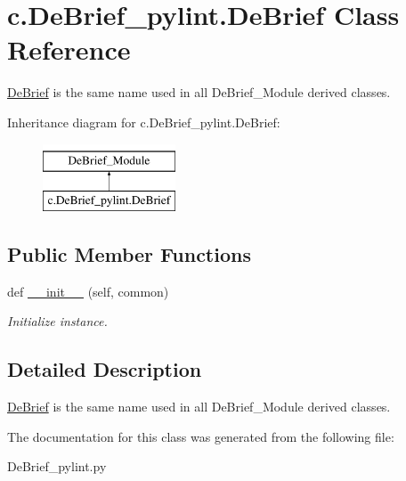 \hypertarget{classc_1_1_de_brief__pylint_1_1_de_brief}{}\section{c.\+De\+Brief\+\_\+pylint.\+De\+Brief Class Reference}
\label{classc_1_1_de_brief__pylint_1_1_de_brief}


\hyperlink{classc_1_1_de_brief__pylint_1_1_de_brief}{De\+Brief} is the same name used in all De\+Brief\+\_\+\+Module derived classes.  


Inheritance diagram for c.\+De\+Brief\+\_\+pylint.\+De\+Brief\+:\begin{figure}[H]
\begin{center}
\leavevmode
\includegraphics[height=2.000000cm]{classc_1_1_de_brief__pylint_1_1_de_brief}
\end{center}
\end{figure}
\subsection*{Public Member Functions}
\begin{DoxyCompactItemize}
\item 
\hypertarget{classc_1_1_de_brief__pylint_1_1_de_brief_aa5a33ccf08a642467d643c2e0dcca832}{}def \hyperlink{classc_1_1_de_brief__pylint_1_1_de_brief_aa5a33ccf08a642467d643c2e0dcca832}{\+\_\+\+\_\+init\+\_\+\+\_\+} (self, common)\label{classc_1_1_de_brief__pylint_1_1_de_brief_aa5a33ccf08a642467d643c2e0dcca832}

\begin{DoxyCompactList}\small\item\em Initialize instance. \end{DoxyCompactList}\end{DoxyCompactItemize}


\subsection{Detailed Description}
\hyperlink{classc_1_1_de_brief__pylint_1_1_de_brief}{De\+Brief} is the same name used in all De\+Brief\+\_\+\+Module derived classes. 



The documentation for this class was generated from the following file\+:\begin{DoxyCompactItemize}
\item 
De\+Brief\+\_\+pylint.\+py\end{DoxyCompactItemize}
